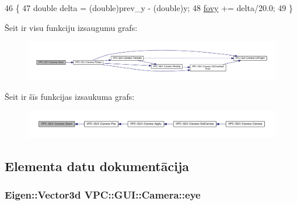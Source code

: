 \begin{DoxyCode}
46 \{
47     \textcolor{keywordtype}{double} delta = (double)prev\_y - (\textcolor{keywordtype}{double})y;
48     \hyperlink{class_v_p_c_1_1_g_u_i_1_1_camera_a34f22355b6221876ea44fbfd866471b1}{fovy} += delta/20.0;
49 \}
\end{DoxyCode}


Šeit ir visu funkciju izsaugumu grafs\+:
\nopagebreak
\begin{figure}[H]
\begin{center}
\leavevmode
\includegraphics[width=350pt]{class_v_p_c_1_1_g_u_i_1_1_camera_abdde0bfa7ddf8fbd1e7f04f8865797cd_cgraph}
\end{center}
\end{figure}




Šeit ir šīs funkcijas izsaukuma grafs\+:
\nopagebreak
\begin{figure}[H]
\begin{center}
\leavevmode
\includegraphics[width=350pt]{class_v_p_c_1_1_g_u_i_1_1_camera_abdde0bfa7ddf8fbd1e7f04f8865797cd_icgraph}
\end{center}
\end{figure}




\subsection{Elementa datu dokumentācija}
\subsubsection[{\texorpdfstring{eye}{eye}}]{\setlength{\rightskip}{0pt plus 5cm}Eigen\+::\+Vector3d V\+P\+C\+::\+G\+U\+I\+::\+Camera\+::eye\hspace{0.3cm}{\ttfamily [private]}}\hypertarget{class_v_p_c_1_1_g_u_i_1_1_camera_aa8d4d1fb2e40a19c1a18bcf04728e64a}{}\label{class_v_p_c_1_1_g_u_i_1_1_camera_aa8d4d1fb2e40a19c1a18bcf04728e64a}


